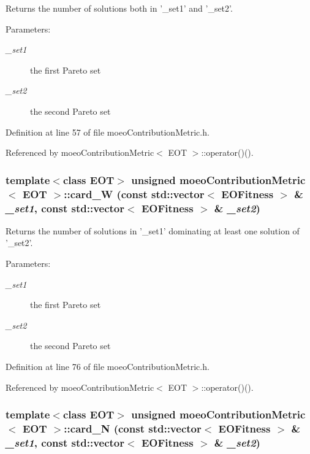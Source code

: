 Returns the number of solutions both in '\_\-set1' and '\_\-set2'. 

\begin{Desc}
\item[Parameters:]
\begin{description}
\item[{\em \_\-set1}]the first Pareto set \item[{\em \_\-set2}]the second Pareto set \end{description}
\end{Desc}


Definition at line 57 of file moeo\-Contribution\-Metric.h.

Referenced by moeo\-Contribution\-Metric$<$ EOT $>$::operator()().
\subsubsection{\setlength{\rightskip}{0pt plus 5cm}template$<$class EOT$>$ unsigned {\bf moeo\-Contribution\-Metric}$<$ EOT $>$::card\_\-W (const std::vector$<$ {\bf EOFitness} $>$ \& {\em \_\-set1}, const std::vector$<$ {\bf EOFitness} $>$ \& {\em \_\-set2})\hspace{0.3cm}{\tt  [inline, private]}}\label{classmoeoContributionMetric_64a72db699a10d6b4794773d4adbae3c}


Returns the number of solutions in '\_\-set1' dominating at least one solution of '\_\-set2'. 

\begin{Desc}
\item[Parameters:]
\begin{description}
\item[{\em \_\-set1}]the first Pareto set \item[{\em \_\-set2}]the second Pareto set \end{description}
\end{Desc}


Definition at line 76 of file moeo\-Contribution\-Metric.h.

Referenced by moeo\-Contribution\-Metric$<$ EOT $>$::operator()().
\subsubsection{\setlength{\rightskip}{0pt plus 5cm}template$<$class EOT$>$ unsigned {\bf moeo\-Contribution\-Metric}$<$ EOT $>$::card\_\-N (const std::vector$<$ {\bf EOFitness} $>$ \& {\em \_\-set1}, const std::vector$<$ {\bf EOFitness} $>$ \& {\em \_\-set2})\hspace{0.3cm}{\tt  [inline, private]}}\label{classmoeoContributionMetric_9960fc1396dbadb412719aaeeedcf961}


